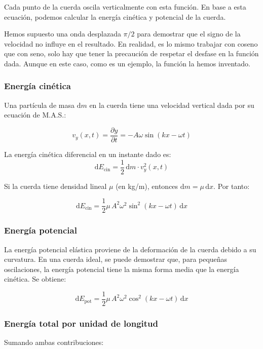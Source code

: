 Cada punto de la cuerda oscila verticalmente con esta función. En base a esta ecuación, podemos calcular la energía cinética y potencial de la cuerda.

\begin{tcolorbox}[myconclusion]
  Hemos supuesto una onda desplazada \(\pi/2\) para demostrar que el signo de la velocidad no influye en el resultado. En realidad, es lo mismo trabajar con coseno que con seno, solo hay que tener la precaución de respetar el desfase en la función dada. Aunque en este caso, como es un ejemplo, la función la hemos inventado.
\end{tcolorbox}

\subsubsection{Energía cinética}

Una partícula de masa \(\mathrm{d}m\) en la cuerda tiene una velocidad vertical dada por su ecuación de M.A.S.:

\[
v_y(x,t) = \frac{\partial y}{\partial t} = -A \omega \sin(kx - \omega t)
\]

La energía cinética diferencial en un instante dado es:
\[
\mathrm{d}E_{\text{cin}} = \frac{1}{2} \, \mathrm{d}m \cdot v_y^2(x,t)
\]

Si la cuerda tiene densidad lineal \(\mu\) (en kg/m), entonces \(\mathrm{d}m = \mu \, \mathrm{d}x\). Por tanto:

\[
\mathrm{d}E_{\text{cin}} = \frac{1}{2} \mu \, A^2 \omega^2 \sin^2(kx - \omega t) \, \mathrm{d}x
\]

\subsubsection{Energía potencial}

La energía potencial elástica proviene de la deformación de la cuerda debido a su curvatura. En una cuerda ideal, se puede demostrar que, para pequeñas oscilaciones, la energía potencial tiene la misma forma media que la energía cinética. Se obtiene:

\[
\mathrm{d}E_{\text{pot}} = \frac{1}{2} \mu \, A^2 \omega^2 \cos^2(kx - \omega t) \, \mathrm{d}x
\]

\subsubsection{Energía total por unidad de longitud}

Sumando ambas contribuciones:


